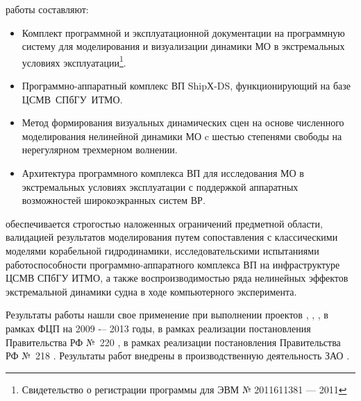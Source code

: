  работы составляют:
\begin{itemize}
\item	Комплект программной и эксплуатационной документации на программную систему для моделирования и визуализации динамики МО в экстремальных условиях эксплуатации\footnote{Свидетельство о регистрации программы для ЭВМ № 2011611381 --– 2011}.
\item	Программно-аппаратный комплекс ВП ShipХ-DS, функционирующий на базе \mbox{ЦСМВ~СПбГУ~ИТМО}.
\end{itemize}



\begin{itemize}
\item	Метод формирования визуальных динамических сцен на основе численного моделирования нелинейной динамики МО c шестью степенями свободы на нерегулярном трехмерном волнении.
\item	Архитектура программного комплекса ВП для исследования МО в экстремальных условиях эксплуатации с поддержкой аппаратных возможностей широкоэкранных систем ВР.
\end{itemize}


 обеспечивается строгостью наложенных ограничений предметной области, валидацией результатов моделирования путем сопоставления с классическими моделями корабельной гидродинамики, исследовательскими испытаниями работоспособности программно-аппаратного комплекса ВП на инфраструктуре ЦСМВ СПбГУ ИТМО, а также воспроизводимостью ряда нелинейных эффектов экстремальной динамики судна в ходе компьютерного эксперимента.

 Результаты работы нашли свое применение при выполнении проектов , , ,  в рамках ФЦП  на 2009 -– 2013 годы,  в рамках реализации постановления Правительства РФ №~220 ,  в рамках реализации постановления Правительства РФ №~218 . Результаты работ внедрены в производственную деятельность ЗАО .

